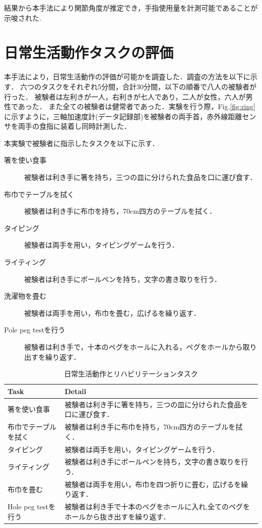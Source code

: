 結果から本手法により関節角度が推定でき，手指使用量を計測可能であることが示唆された.

\section{日常生活動作タスクの評価}
本手法により，日常生活動作の評価が可能かを調査した．調査の方法を以下に示す．
六つのタスクをそれぞれ5分間，合計30分間，以下の順番で八人の被験者が行った．
被験者は左利きが一人，右利きが七人であり，二人が女性，六人が男性であった．
また全ての被験者は健常者であった．実験を行う際，Fig.\ref{fig:ring}に示すように，三軸加速度計(データ記録部)を被験者の両手首，赤外線距離センサを両手の食指に装着し同時計測した．

本実験で被験者に指示したタスクを以下に示す．
\begin{description}
\item[箸を使い食事]
被験者は利き手に箸を持ち，三つの皿に分けられた食品を口に運び食す．

\item[布巾でテーブルを拭く]
被験者は利き手に布巾を持ち，70cm四方のテーブルを拭く．

\item[タイピング]
被験者は両手を用い，タイピングゲームを行う．

\item[ライティング]
被験者は利き手にボールペンを持ち，文字の書き取りを行う．

\item[洗濯物を畳む]
被験者は両手を用い，布巾を畳む，広げるを繰り返す．

\item[Pole peg testを行う]
被験者は利き手で，十本のペグをホールに入れる，ペグをホールから取り出すを繰り返す．

\end{description}
\fi
\begin{table}[H]
  \caption{日常生活動作とリハビリテーションタスク}
  \label{table:tasks}
  \centering
  \begin{tabular}{ll}
    \hline
    Task &  Detail  \\
    \hline \hline
箸を使い食事&
被験者は利き手に箸を持ち，三つの皿に分けられた食品を口に運び食す．\\

布巾でテーブルを拭く&
被験者は利き手に布巾を持ち，70cm四方のテーブルを拭く．\\

タイピング&
被験者は両手を用い，タイピングゲームを行う．\\

ライティング&
被験者は利き手にボールペンを持ち，文字の書き取りを行う．\\

布巾を畳む&
被験者は両手を用い，布巾を四つ折りに畳む，広げるを繰り返す．\\

Hole peg testを行う&
被験者は利き手で十本のペグをホールに入れ,全てのペグをホールから抜き出すを繰り返す．\\

    \hline
  \end{tabular}
\end{table}

